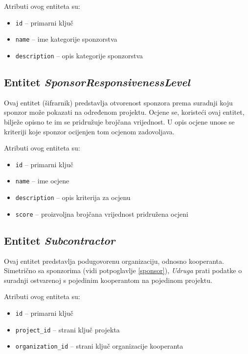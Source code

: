 \documentclass[times, utf8, diplomski]{fer}
\begin{document}
\medskip
Atributi ovog entiteta su:
\begin{itemize}
    \item \texttt{id} -- primarni ključ
    \item \texttt{name} -- ime kategorije sponzorstva
    \item \texttt{description} -- opis kategorije sponzorstva
\end{itemize}

\subsection{Entitet \emph{SponsorResponsivenessLevel}}
\label{sponsor_responsiveness_level}

Ovaj entitet (šifrarnik) predstavlja otvorenost sponzora prema suradnji koju
sponzor može pokazati na određenom projektu. Ocjene se, koristeći ovaj entitet,
bilježe opisno te im se pridružuje brojčana vrijednost. U opis ocjene unose se
kriteriji koje sponzor ocijenjen tom ocjenom zadovoljava.

\medskip
Atributi ovog entiteta su:
\begin{itemize}
    \item \texttt{id} -- primarni ključ
    \item \texttt{name} -- ime ocjene
    \item \texttt{description} -- opis kriterija za ocjenu
    \item \texttt{score} -- proizvoljna brojčana vrijednost pridružena ocjeni
\end{itemize}

\subsection{Entitet \emph{Subcontractor}} \label{subcontractor}

Ovaj entitet predstavlja podugovorenu organizaciju, odnosno kooperanta.
Simetrično sa sponzorima (vidi potpoglavlje \ref{sponsor}), \emph{Udruga} prati
podatke o suradnji ostvarenoj s pojedinim kooperantom na pojedinom projektu.

\medskip
Atributi ovog entiteta su:
\begin{itemize}
    \item \texttt{id} -- primarni ključ
    \item \texttt{project\_id} -- strani ključ projekta
    \item \texttt{organization\_id} -- strani ključ organizacije kooperanta
\end{itemize}
\end{document}
